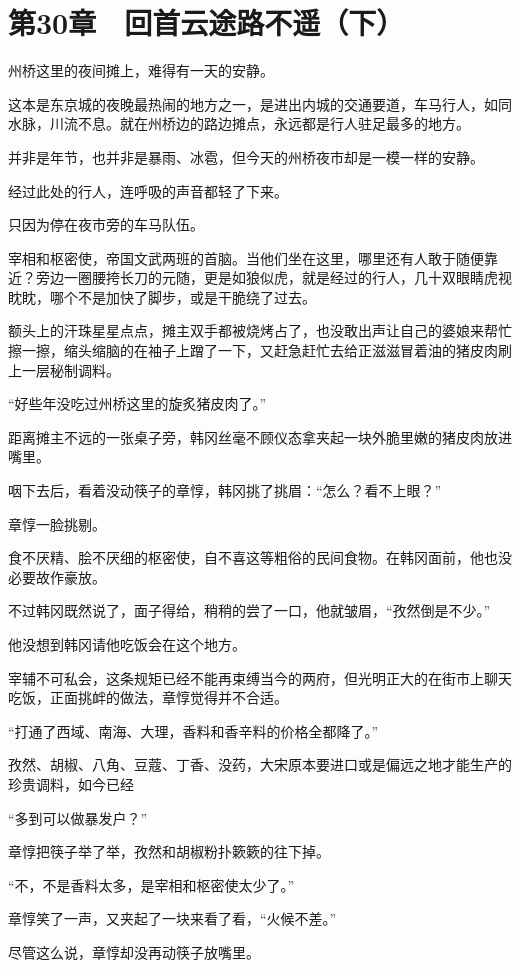 \section{第30章　回首云途路不遥（下）}

州桥这里的夜间摊上，难得有一天的安静。

这本是东京城的夜晚最热闹的地方之一，是进出内城的交通要道，车马行人，如同水脉，川流不息。就在州桥边的路边摊点，永远都是行人驻足最多的地方。

并非是年节，也并非是暴雨、冰雹，但今天的州桥夜市却是一模一样的安静。

经过此处的行人，连呼吸的声音都轻了下来。

只因为停在夜市旁的车马队伍。

宰相和枢密使，帝国文武两班的首脑。当他们坐在这里，哪里还有人敢于随便靠近？旁边一圈腰挎长刀的元随，更是如狼似虎，就是经过的行人，几十双眼睛虎视眈眈，哪个不是加快了脚步，或是干脆绕了过去。

额头上的汗珠星星点点，摊主双手都被烧烤占了，也没敢出声让自己的婆娘来帮忙擦一擦，缩头缩脑的在袖子上蹭了一下，又赶急赶忙去给正滋滋冒着油的猪皮肉刷上一层秘制调料。

“好些年没吃过州桥这里的旋炙猪皮肉了。”

距离摊主不远的一张桌子旁，韩冈丝毫不顾仪态拿夹起一块外脆里嫩的猪皮肉放进嘴里。

咽下去后，看着没动筷子的章惇，韩冈挑了挑眉：“怎么？看不上眼？”

章惇一脸挑剔。

食不厌精、脍不厌细的枢密使，自不喜这等粗俗的民间食物。在韩冈面前，他也没必要故作豪放。

不过韩冈既然说了，面子得给，稍稍的尝了一口，他就皱眉，“孜然倒是不少。”

他没想到韩冈请他吃饭会在这个地方。

宰辅不可私会，这条规矩已经不能再束缚当今的两府，但光明正大的在街市上聊天吃饭，正面挑衅的做法，章惇觉得并不合适。

“打通了西域、南海、大理，香料和香辛料的价格全都降了。”

孜然、胡椒、八角、豆蔻、丁香、没药，大宋原本要进口或是偏远之地才能生产的珍贵调料，如今已经

“多到可以做暴发户？”

章惇把筷子举了举，孜然和胡椒粉扑簌簌的往下掉。

“不，不是香料太多，是宰相和枢密使太少了。”

章惇笑了一声，又夹起了一块来看了看，“火候不差。”

尽管这么说，章惇却没再动筷子放嘴里。

